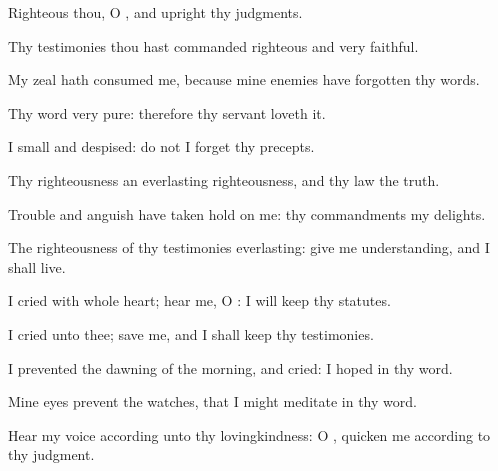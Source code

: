 {
\par }
{\Q {}Righteous
{} thou, O
{}, and
upright
{} thy
judgments.


\par }{\Q {}Thy
testimonies
{} thou hast
commanded
{}
righteous and
very
faithful.


\par }{\Q {}My
zeal hath
consumed me, because mine
enemies have
forgotten thy
words.


\par }{\Q {}Thy
word
{}
very
pure: therefore thy
servant
loveth it.


\par }{\Q {}I
{}
small and
despised:
{} do not I
forget thy
precepts.


\par }{\Q {}Thy
righteousness
{} an
everlasting
righteousness, and thy
law
{} the
truth.


\par }{\BB \par }
{\Q {}Trouble and
anguish have taken
hold on me:
{} thy
commandments
{} my
delights.


\par }{\Q {}The
righteousness of thy
testimonies
{}
everlasting: give me
understanding, and I shall
live.


\par }{\BB \par }
{
\par }
{\Q {}I
cried with
{} whole
heart;
hear me, O
{}: I will
keep thy
statutes.


\par }{\Q {}I
cried unto thee;
save me, and I shall
keep thy
testimonies.


\par }{\BB \par }
{\Q {}I
prevented the dawning of the
morning, and
cried: I
hoped in thy
word.


\par }{\Q {}Mine
eyes
prevent the
{}
watches, that I might
meditate in thy
word.


\par }{\Q {}Hear my
voice according unto thy
lovingkindness: O
{},
quicken me according to thy
judgment.


\par }{\BB \par }
